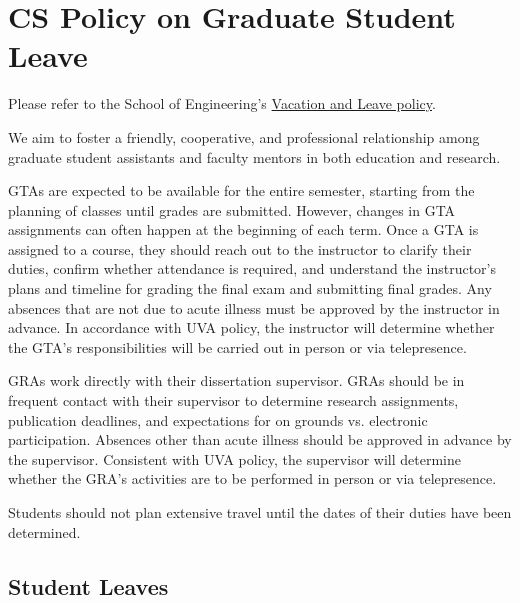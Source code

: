 \newpage
\hypertarget{appendix-b-cs-policy-on-graduate-student-leave}{%
\section{CS Policy on Graduate Student Leave}\label{appendix-b-cs-policy-on-graduate-student-leave}}

Please refer to the School of Engineering's \href{\GRtwentyfiveVL}{Vacation and Leave policy}.

We aim to foster a friendly, cooperative, and professional relationship among graduate student assistants and faculty mentors in both education and research.

GTAs are expected to be available for the entire semester, starting from the planning of classes until grades are submitted. However, changes in GTA assignments can often happen at the beginning of each term. Once a GTA is assigned to a course, they should reach out to the instructor to clarify their duties, confirm whether attendance is required, and understand the instructor's plans and timeline for grading the final exam and submitting final grades. Any absences that are not due to acute illness must be approved by the instructor in advance. In accordance with UVA policy, the instructor will determine whether the GTA's responsibilities will be carried out in person or via telepresence.

GRAs work directly with their dissertation supervisor. GRAs should be in
frequent contact with their supervisor to determine research
assignments, publication deadlines, and expectations for on grounds vs.
electronic participation. Absences other than acute illness should be
approved in advance by the supervisor. Consistent with UVA policy, the
supervisor will determine whether the GRA's activities are to be
performed in person or via telepresence.

Students should not plan extensive travel until the dates of their
duties have been determined.

\hypertarget{student-leaves}{%
\subsection{Student Leaves}\label{student-leaves}}

